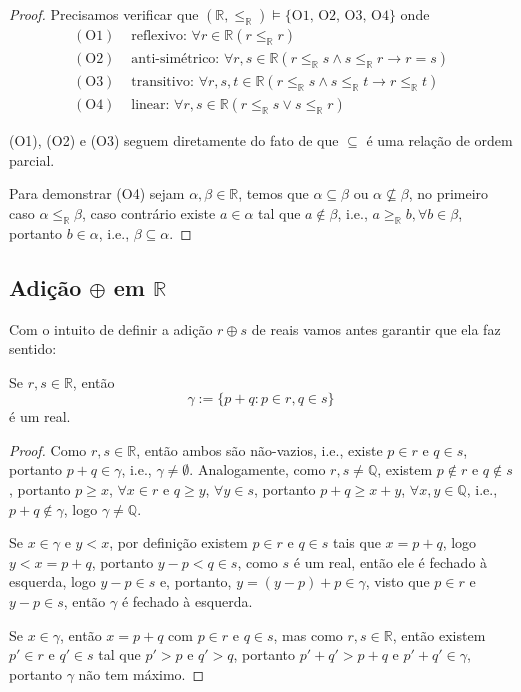 \documentclass[11pt]{article}
\newcommand{\mbb}[1]{\mathbb{#1}}
\newcommand{\leqr}{\leq_\mbb{R}}
\begin{document}
\begin{proof}
    Precisamos verificar que $(\mbb{R},\leqr)\vDash\{\text{O1, O2, O3, O4}\}$ onde
    \begin{align*}
        (\text{O1}) & \text{ reflexivo: }\forall r\in\mbb{R}(r\leqr r)\\
        (\text{O2}) & \text{ anti-simétrico: }\forall r,s\in\mbb{R}(r\leqr s\wedge s\leqr r\to r = s)\\
        (\text{O3}) & \text{ transitivo: }\forall r,s,t\in\mbb{R}(r\leqr s\wedge s\leqr t\to r\leqr t)\\
        (\text{O4}) & \text{ linear: }\forall r,s\in\mbb{R}(r\leqr s\vee s\leqr r)
    \end{align*}

    (O1), (O2) e (O3) seguem diretamente do fato de que $\subseteq$ é uma relação de ordem parcial.

    Para demonstrar (O4) sejam $\alpha,\beta\in\mbb{R}$, temos que $\alpha\subseteq\beta$ ou $\alpha\nsubseteq\beta$, no primeiro caso $\alpha\leqr\beta$, caso contrário existe $a\in\alpha$ tal que $a\notin\beta$, i.e., $a\geq_\mbb{R} b,\forall b\in\beta$, portanto $b\in\alpha$, i.e., $\beta\subseteq\alpha$.
\end{proof}

\subsection{Adição $\oplus$ em $\mbb{R}$}

Com o intuito de definir a adição $r\oplus s$ de reais vamos antes garantir que ela faz sentido:

\begin{shaded}
\begin{theorem}
    Se $r,s\in\mbb{R}$, então
    $$\gamma:=\{p+q:p\in r,q\in s\}$$
    é um real.
\end{theorem}
\end{shaded}

\begin{proof}
    Como $r,s\in\mbb{R}$, então ambos são não-vazios, i.e., existe $p\in r$ e $q\in s$, portanto $p+q\in\gamma$, i.e., $\gamma\neq\emptyset$. Analogamente, como $r,s\neq\mbb{Q}$, existem $p\notin r$ e $q\notin s$, portanto $p\geq x$, $\forall x\in r$ e $q\geq y$, $\forall y\in s$, portanto $p+q\geq x+y$, $\forall x,y\in\mbb{Q}$, i.e., $p+q\notin\gamma$, logo $\gamma\neq\mbb{Q}$.

    Se $x\in\gamma$ e $y< x$, por definição existem $p\in r$ e $q\in s$ tais que $x=p+q$, logo $y< x=p+q$, portanto $y-p< q\in s$, como $s$ é um real, então ele é fechado à esquerda, logo $y-p\in s$ e, portanto, $y=(y-p)+p\in\gamma$, visto que $p\in r$ e $y-p\in s$, então $\gamma$ é fechado à esquerda.

    Se $x\in\gamma$, então $x=p+q$ com $p\in r$ e $q\in s$, mas como $r,s\in\mbb{R}$, então existem $p'\in r$ e $q'\in s$ tal que $p'> p$ e $q'> q$, portanto $p'+q'> p+q$ e $p'+q'\in\gamma$, portanto $\gamma$ não tem máximo.
\end{proof}
\end{document}
